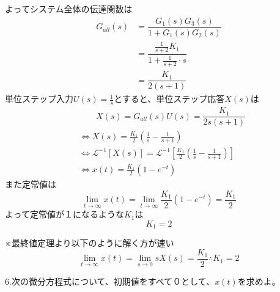 \documentclass[a4paper,12pt]{article}
\begin{document}
\begin{tcolorbox}
\begin{center}
\end{center}
\vspace{-4mm}
よってシステム全体の伝達関数は
\vspace{-4mm}
\begin{align*}
  G_{all}(s) &=\dfrac{G_1(s) G_3(s)}{1 + G_1(s) G_2(s)} \\
            & =\dfrac{\frac{1}{s+2} K_1}{1 +\frac{1}{s+2} \cdot s} \\
            & =\dfrac{K_1}{2(s+1)}
\end{align*}
単位ステップ入力\(U(s)=\frac{1}{s}\)とすると、単位ステップ応答\(X(s)\)は
\vspace{-3mm}
\begin{align*}
    &\qquad X(s) =G_{all}(s) U(s)=\dfrac{K_1}{2s(s+1)} \\
    &\Leftrightarrow X(s) = \frac{K_1}{2}\left(\frac{1}{s} - \frac{1}{s+1} \right) \\
    &\Leftrightarrow \mathcal{L}^{-1} \left[ X(s)  \right]
    =\mathcal{L}^{-1} \left[ \frac{K_1}{2}\left(\frac{1}{s} - \frac{1}{s+1} \right) \right]\\
    &\Leftrightarrow x(t) =  \frac{K_1}{2} \left(1-e^{-t} \right)
\end{align*}
また定常値は
\[
\lim_{t \to \infty} x(t) = \lim_{t \to \infty} \frac{K_1}{2} \left(1-e^{-t} \right) = \frac{K_1}{2}
\]
よって定常値が１になるような\(K_1\)は
\vspace{-3mm}
\[
K_1=2
\]
  \begin{tcolorbox}[title={}]
  ※最終値定理より以下のように解く方が速い
  \[
  \lim_{t \to \infty} x(t) = \lim_{s \to 0} sX(s) = \frac{K_1}{2} \therefore K_1=2
  \]
  \end{tcolorbox}
\end{tcolorbox}

\newpage

\noindent
6.次の微分方程式について、初期値をすべて０として、\(x(t)\)を求めよ。\\
\end{document}
